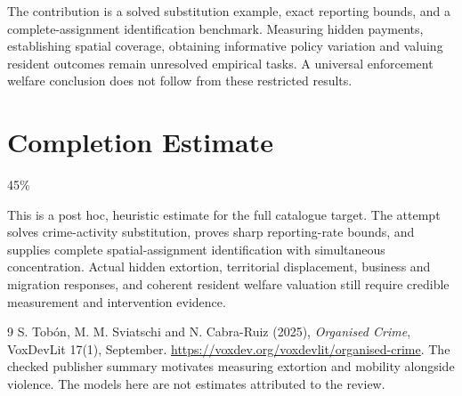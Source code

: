 \documentclass[11pt,a4paper]{article}
\begin{document}
The contribution is a solved substitution example, exact reporting bounds, and a complete-assignment identification benchmark. Measuring hidden payments, establishing spatial coverage, obtaining informative policy variation and valuing resident outcomes remain unresolved empirical tasks. A universal enforcement welfare conclusion does not follow from these restricted results.

\section{Completion Estimate}
45\%

This is a post hoc, heuristic estimate for the full catalogue target.
The attempt solves crime-activity substitution, proves sharp reporting-rate bounds, and supplies complete spatial-assignment identification with simultaneous concentration. Actual hidden extortion, territorial displacement, business and migration responses, and coherent resident welfare valuation still require credible measurement and intervention evidence.

\begin{thebibliography}{9}
 S. Tob\'on, M. M. Sviatschi and N. Cabra-Ruiz (2025), \emph{Organised Crime}, VoxDevLit 17(1), September. \url{https://voxdev.org/voxdevlit/organised-crime}. The checked publisher summary motivates measuring extortion and mobility alongside violence. The models here are not estimates attributed to the review.
\end{thebibliography}
\end{document}
